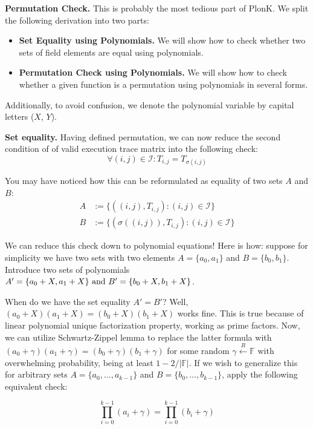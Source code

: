 \documentclass[../lecture-notes.tex]{subfiles}
\begin{document}
\textcolor{green!60!black}{\textbf{Permutation Check.}} This is probably the most
tedious part of PlonK. We split the following derivation into two parts:
\begin{itemize}
    \item \textbf{Set Equality using Polynomials.} We will show how to check
    whether two sets of field elements are equal using polynomials.
    \item \textbf{Permutation Check using Polynomials.} We will show how to
    check whether a given function is a permutation using polynomials in several 
    forms.
\end{itemize}

Additionally, to avoid confusion, we denote the polynomial variable by capital letters ($X$, $Y$).

\textbf{Set equality.} Having defined permutation, we can now reduce the second
condition of  of valid execution trace matrix into
the following check:
\[\forall (i, j) \in \mathcal{I}: T_{i,j} = T_{\sigma(i,j)}\]

You may have noticed how this can be reformulated as equality of two sets $A$ and $B$:
\begin{align*}
    A &:= \{((i, j), T_{i,j}) : (i, j) \in \mathcal{I}\} \\
    B &:= \{(\sigma((i, j)), T_{i,j}) : (i, j) \in \mathcal{I}\}
\end{align*}

We can reduce this check down to polynomial equations! Here is how: suppose for
simplicity we have two sets with two elements \(A = \{a_0, a_1\}\) and \(B =
\{b_0, b_1\}\). Introduce two sets of polynomials \(A' = \{a_0 + X, a_1 +
X\}$ and $B' = \{b_0 + X, b_1 + X\}\). 

When do we have the set equality \(A' = B'\)? Well, \((a_0 + X)(a_1 + X) = (b_0
+ X)(b_1 + X)\) works fine. This is true because of linear polynomial unique
factorization property, working as prime factors. Now, we can utilize
Schwartz-Zippel lemma to replace the latter formula with \((a_0 + \gamma)(a_1 +
\gamma) = (b_0 + \gamma)(b_1 + \gamma)\) for some random $\gamma \xleftarrow{R}
\mathbb{F}$ with overwhelming probability, being at least $1-2/|\mathbb{F}|$. If we
wish to generalize this for arbitrary sets \(A = \{a_0, \ldots, a_{k-1}\}\) and
\(B = \{b_0, \ldots, b_{k-1}\}\), apply the following equivalent check:

\[\prod_{i=0}^{k-1} (a_i + \gamma) = \prod_{i=0}^{k-1} (b_i + \gamma)\]
\end{document}
